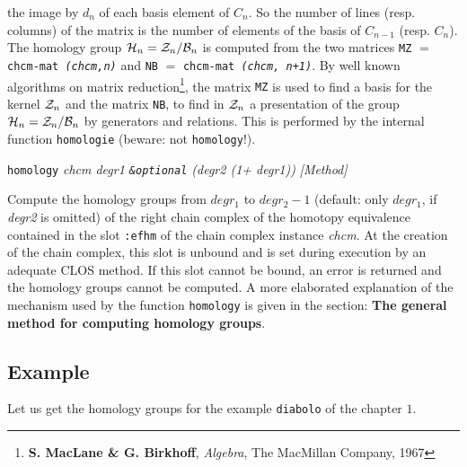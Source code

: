 {{the image by $d_n$ of each basis element of $C_n$. So the number of lines (resp. columns) of the matrix is
the number of elements of the basis of $C_{n-1}$ (resp. $C_n$).
The homology group
${\cal H}_n={\cal Z}_n/{\cal B}_n$ is computed from the two matrices 
{\tt MZ} $=$ {\tt chcm-mat {\em (chcm,n)}} and 
{\tt NB} $=$ {\tt chcm-mat {\em (chcm, n+1)}}. By well known algorithms 
on matrix reduction\footnote{{\bf S. MacLane \& G. Birkhoff}, {\em Algebra}, 
The MacMillan Company, 1967}, the matrix {\tt MZ}  is used
to find a basis for the kernel ${\cal Z}_n$ and the matrix {\tt NB}, to find in ${\cal Z}_n$ a presentation
of the group ${\cal H}_n={\cal Z}_n/{\cal B}_n$ by generators and relations. This is performed
by the internal function {\tt homologie} (beware: not {\tt homology}!).\par}
{\leftskip=5mm 
{\tt homology} {\em chcm  degr1 {\tt \&optional} (degr2 (1+ degr1))} \hfill {\em [Method]} \par}
{\leftskip=15mm 
Compute the homology groups from $degr_1$ to $degr_2-1$ (default: only $degr_1$, if {\em degr2} is omitted) of
the right chain complex of the homotopy equivalence contained in the slot {\tt :efhm} of the
chain complex instance {\em chcm}. At the creation of the chain complex, this slot is unbound and
is set during execution by an adequate CLOS method. If this slot cannot be  bound, an error is returned and
the homology groups cannot be computed. A more elaborated explanation of the mechanism used by the function
{\tt homology} is given in the  section: {\bf The general method for computing homology groups}. \par}
}

\subsection* {Example}

Let us get the homology groups for the example {\tt diabolo} of the chapter $1$.

